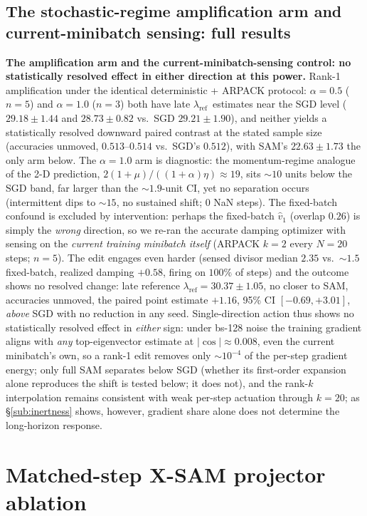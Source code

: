 \documentclass{article}
\theoremstyle{plain}
\theoremstyle{definition}
\theoremstyle{remark}
\newcommand{\lref}{\ensuremath{\lambda_{\mathrm{ref}}}}
\begin{document}
\subsection{The stochastic-regime amplification arm and current-minibatch sensing: full results}
\textbf{The amplification arm and the current-minibatch-sensing control: no
statistically resolved effect in either direction at this power.} Rank-1 amplification under the identical
deterministic + ARPACK protocol: $\alpha{=}0.5$ ($n{=}5$) and
$\alpha{=}1.0$ ($n{=}3$) both have late \lref\ estimates near the SGD
level ($29.18\!\pm\!1.44$ and $28.73\!\pm\!0.82$ vs.\ SGD
$29.21\!\pm\!1.90$), and neither yields a statistically resolved
downward paired contrast at the stated sample size (accuracies
unmoved, $0.513$--$0.514$ vs.\ SGD's $0.512$), with SAM's
$22.63\!\pm\!1.73$ the
only arm below. The $\alpha{=}1.0$ arm is diagnostic: the momentum-regime
analogue of the 2-D prediction, $2(1{+}\mu)/((1{+}\alpha)\eta)\!\approx\!19$,
sits ${\sim}10$ units below the SGD band, far larger than the
${\sim}1.9$-unit CI, yet no separation occurs (intermittent dips to
${\sim}15$, no sustained shift; $0$ NaN steps). The fixed-batch
confound is excluded by intervention: perhaps the fixed-batch $\hat v_{1}$
(overlap $0.26$) is simply the \emph{wrong} direction, so we re-ran the
accurate damping optimizer with sensing on the \emph{current training
minibatch itself} (ARPACK $k{=}2$ every $N{=}20$ steps; $n{=}5$). The
edit engages even harder (sensed divisor median $2.35$ vs.\
${\sim}1.5$ fixed-batch, realized damping $+0.58$, firing on $100\%$ of
steps) and the outcome shows no resolved change: late reference $\lref =
30.37\pm1.05$, no closer to SAM, accuracies unmoved, the paired point
estimate $+1.16$, 95\% CI $[{-}0.69,{+}3.01]$, \emph{above} SGD with no
reduction in
any seed. Single-direction action thus shows no statistically resolved effect in
\emph{either} sign: under bs-128 noise the training gradient aligns with
\emph{any} top-eigenvector estimate at $|\cos|\!\approx\!0.008$, even
the current minibatch's own, so a rank-1 edit removes only
${\sim}10^{-4}$ of the per-step gradient energy; only full SAM
separates below SGD (whether its first-order expansion alone
reproduces the shift is tested
below; it does not), and the rank-$k$ interpolation remains consistent
with weak per-step actuation through $k{=}20$; as \S\ref{sub:inertness}
shows, however, gradient share alone does not determine the long-horizon
response.

\section{Matched-step X-SAM projector ablation}
\label{app:xsam}
\end{document}

